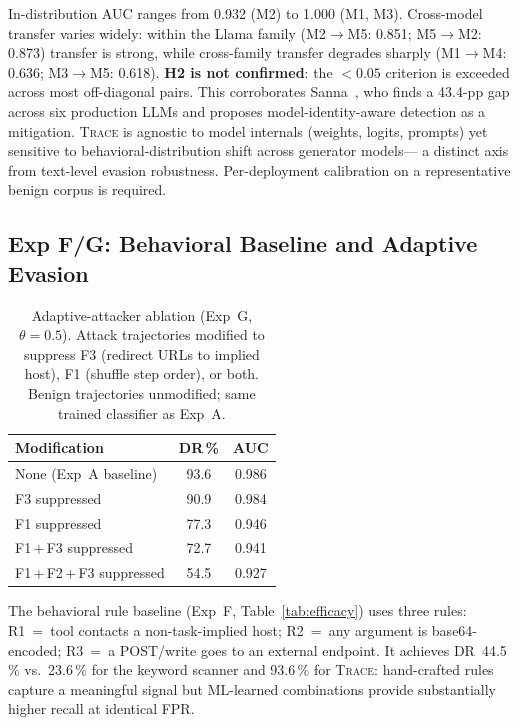 \documentclass[conference]{IEEEtran}
\begin{document}
In-distribution AUC ranges from 0.932 (M2) to 1.000 (M1, M3).
Cross-model transfer varies widely: within the Llama family
(M2$\to$M5: 0.851; M5$\to$M2: 0.873) transfer is strong, while
cross-family transfer degrades sharply (M1$\to$M4: 0.636;
M3$\to$M5: 0.618).  \textbf{H2 is not confirmed}: the $<0.05$
criterion is exceeded across most off-diagonal pairs.
This corroborates Sanna~\cite{sanna2025crossllm},
who finds a 43.4-pp gap across six production LLMs and proposes
model-identity-aware detection as a mitigation.
\textsc{Trace} is agnostic to model internals (weights, logits, prompts)
yet sensitive to behavioral-distribution shift across generator models---
a distinct axis from text-level evasion robustness.
Per-deployment calibration on a representative benign corpus is required.

\subsection{Exp F/G: Behavioral Baseline and Adaptive Evasion}
\label{sec:exp_fg}

\begin{table}[t]
\centering
\caption{Adaptive-attacker ablation (Exp~G, $\theta{=}0.5$).
  Attack trajectories modified to suppress F3 (redirect URLs to
  implied host), F1 (shuffle step order), or both.
  Benign trajectories unmodified; same trained classifier as Exp~A.}
\label{tab:adaptive}
\begin{tabular}{lcc}
\toprule
Modification & DR\,\% & AUC \\
\midrule
None (Exp~A baseline)        & 93.6 & 0.986 \\
F3 suppressed                & 90.9 & 0.984 \\
F1 suppressed                & 77.3 & 0.946 \\
F1\,+\,F3 suppressed        & 72.7 & 0.941 \\
F1\,+\,F2\,+\,F3 suppressed & 54.5 & 0.927 \\
\bottomrule
\end{tabular}
\end{table}

The behavioral rule baseline (Exp~F, Table~\ref{tab:efficacy}) uses
three rules: R1~=~tool contacts a non-task-implied host; R2~=~any
argument is base64-encoded; R3~=~a POST/write goes to an external
endpoint.  It achieves DR~44.5\,\% vs.\ 23.6\,\% for the keyword
scanner and 93.6\,\% for \textsc{Trace}: hand-crafted rules capture
a meaningful signal but ML-learned combinations provide substantially
higher recall at identical FPR.
\end{document}
